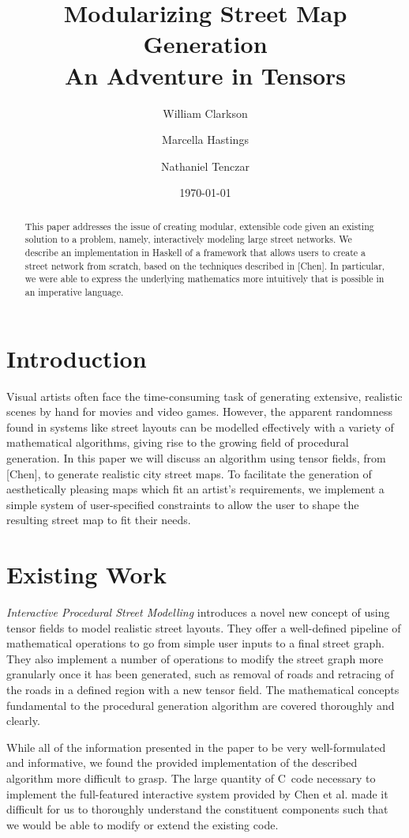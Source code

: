 \documentclass[twocolumn]{article}
\title{Modularizing Street Map Generation \\
    \vspace{8pt} \large An Adventure in Tensors}
\author{William Clarkson \and Marcella Hastings \and Nathaniel Tenczar}
\date{\today}
\def \cpp {C\nolinebreak[4]\hspace{-.05em}\raisebox{.4ex}{\tiny\bf ++}~}
\begin{document}
\maketitle

\begin{abstract}
This paper addresses the issue of creating modular, extensible code given an
existing solution to a problem, namely, interactively modeling large street
networks. We describe an implementation in Haskell of a framework that allows 
users to create a street network from scratch, based on the techniques described 
in [Chen]. In particular, we were able to express the underlying mathematics
more intuitively that is possible in an imperative language.

\end{abstract}

\section{Introduction}
Visual artists often face the time-consuming task of generating extensive,
realistic scenes by hand for movies and video games. However, the apparent
randomness found in systems like street layouts can be modelled effectively
with a variety of mathematical algorithms, giving rise to the growing field of
procedural generation. In this paper we will discuss an algorithm using tensor
fields, from [Chen], to generate realistic city street maps. To facilitate the
generation of aesthetically pleasing maps which fit an artist's requirements,
we implement a simple system of user-specified constraints to allow the user to
shape the resulting street map to fit their needs.

\section{Existing Work}
\textit{Interactive Procedural Street Modelling} \cite{chen} introduces a novel
new concept of using tensor fields to model realistic street layouts. They 
offer
a well-defined pipeline of mathematical operations to go from simple user
inputs to a final street graph. They also implement a number of operations to
modify the street graph more granularly once it has been generated, such as
removal of roads and retracing of the roads in a defined region with a new
tensor field. The mathematical concepts fundamental to the procedural
generation algorithm are covered thoroughly and clearly.

While all of the information presented in the paper to be very well-formulated
and informative, we found the provided implementation of the described
algorithm more difficult to grasp. The large quantity of \cpp code necessary to
implement the full-featured interactive system provided by Chen et al. made it
difficult for us to thoroughly understand the constituent components such that
we would be able to modify or extend the existing code.
\end{document}
